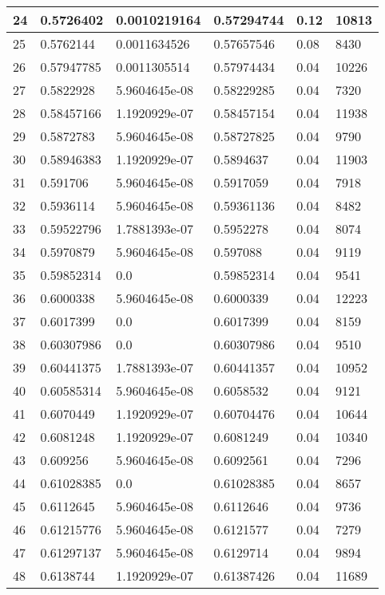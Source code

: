 \begin{longtable}{|l|l|l|l|l|l|}
24 & 0.5726402 & 0.0010219164 & 0.57294744 & 0.12 & 10813 \\ \hline 
25 & 0.5762144 & 0.0011634526 & 0.57657546 & 0.08 & 8430 \\ \hline 
26 & 0.57947785 & 0.0011305514 & 0.57974434 & 0.04 & 10226 \\ \hline 
27 & 0.5822928 & 5.9604645e-08 & 0.58229285 & 0.04 & 7320 \\ \hline 
28 & 0.58457166 & 1.1920929e-07 & 0.58457154 & 0.04 & 11938 \\ \hline 
29 & 0.5872783 & 5.9604645e-08 & 0.58727825 & 0.04 & 9790 \\ \hline 
30 & 0.58946383 & 1.1920929e-07 & 0.5894637 & 0.04 & 11903 \\ \hline 
31 & 0.591706 & 5.9604645e-08 & 0.5917059 & 0.04 & 7918 \\ \hline 
32 & 0.5936114 & 5.9604645e-08 & 0.59361136 & 0.04 & 8482 \\ \hline 
33 & 0.59522796 & 1.7881393e-07 & 0.5952278 & 0.04 & 8074 \\ \hline 
34 & 0.5970879 & 5.9604645e-08 & 0.597088 & 0.04 & 9119 \\ \hline 
35 & 0.59852314 & 0.0 & 0.59852314 & 0.04 & 9541 \\ \hline 
36 & 0.6000338 & 5.9604645e-08 & 0.6000339 & 0.04 & 12223 \\ \hline 
37 & 0.6017399 & 0.0 & 0.6017399 & 0.04 & 8159 \\ \hline 
38 & 0.60307986 & 0.0 & 0.60307986 & 0.04 & 9510 \\ \hline 
39 & 0.60441375 & 1.7881393e-07 & 0.60441357 & 0.04 & 10952 \\ \hline 
40 & 0.60585314 & 5.9604645e-08 & 0.6058532 & 0.04 & 9121 \\ \hline 
41 & 0.6070449 & 1.1920929e-07 & 0.60704476 & 0.04 & 10644 \\ \hline 
42 & 0.6081248 & 1.1920929e-07 & 0.6081249 & 0.04 & 10340 \\ \hline 
43 & 0.609256 & 5.9604645e-08 & 0.6092561 & 0.04 & 7296 \\ \hline 
44 & 0.61028385 & 0.0 & 0.61028385 & 0.04 & 8657 \\ \hline 
45 & 0.6112645 & 5.9604645e-08 & 0.6112646 & 0.04 & 9736 \\ \hline 
46 & 0.61215776 & 5.9604645e-08 & 0.6121577 & 0.04 & 7279 \\ \hline 
47 & 0.61297137 & 5.9604645e-08 & 0.6129714 & 0.04 & 9894 \\ \hline 
48 & 0.6138744 & 1.1920929e-07 & 0.61387426 & 0.04 & 11689 \\ \hline 

\end{longtable}
